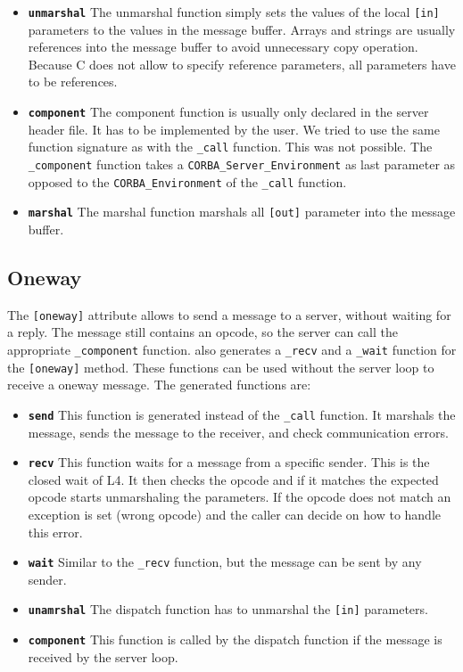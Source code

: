 \begin{itemize}
\item \textbf{\texttt{unmarshal}} The unmarshal function simply sets the values
      of the local \verb|[in]| parameters to the values in the message buffer.
      Arrays and strings are usually references into the message buffer to 
      avoid unnecessary copy operation.  Because C does not allow to specify
      reference parameters, all parameters have to be references.

\item \textbf{\texttt{component}} The component function is usually only 
      declared in the server header file.  It has to be implemented by the 
      user.  We tried to use the same function signature as with the 
      \verb|_call| function.  This was not possible.  The \verb|_component|
      function takes a \verb|CORBA_Server_Environment| as last parameter
      as opposed to the \verb|CORBA_Environment| of the \verb|_call|
      function.

\item \textbf{\texttt{marshal}} The marshal function marshals all \verb|[out]|
      parameter into the message buffer.
\end{itemize}

\subsection{Oneway}

The \verb|[oneway]| attribute allows to send a message to a server, without
waiting for a reply.  The message still contains an opcode, so the server 
can call the appropriate \verb|_component| function.  \dice{} also generates
a \verb|_recv| and a \verb|_wait| function for the \verb|[oneway]| method.
These functions can be used without the server loop to receive a oneway
message.  The generated functions are:

\begin{itemize}
\item \textbf{\texttt{send}} This function is generated instead of the 
      \verb|_call| function. It marshals the message, sends the message
      to the receiver, and check communication errors.

\item \textbf{\texttt{recv}} This function waits for a message from a specific
      sender.  This is the closed wait of L4.  It then checks the opcode
      and if it matches the expected opcode starts unmarshaling the parameters.
      If the opcode does not match an exception is set (wrong opcode) and the
      caller can decide on how to handle this error.

\item \textbf{\texttt{wait}} Similar to the \verb|_recv| function, but the
      message can be sent by any sender.

\item \textbf{\texttt{unamrshal}} The dispatch function has to unmarshal the
      \verb|[in]| parameters.

\item \textbf{\texttt{component}} This function is called by the dispatch 
      function if the message is received by the server loop.
\end{itemize}

